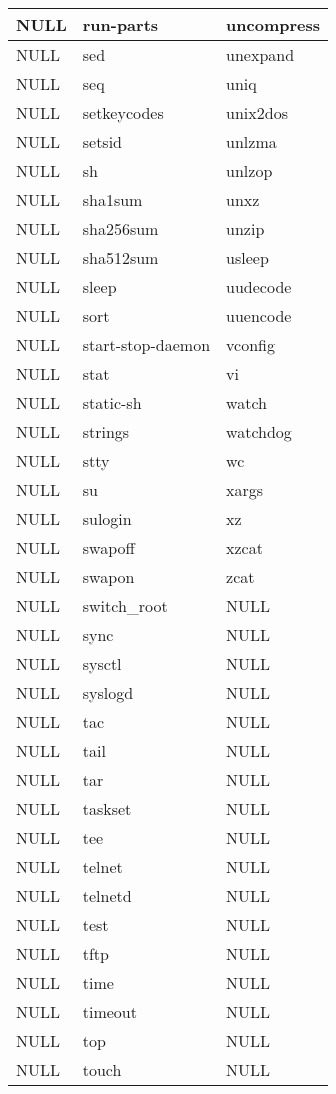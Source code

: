 \begin{longtable}{llp{64mm}}
NULL & run-parts & uncompress \\ \hline
NULL & sed & unexpand \\ \hline
NULL & seq & uniq \\ \hline
NULL & setkeycodes & unix2dos \\ \hline
NULL & setsid & unlzma \\ \hline
NULL & sh & unlzop \\ \hline
NULL & sha1sum & unxz \\ \hline
NULL & sha256sum & unzip \\ \hline
NULL & sha512sum & usleep \\ \hline
NULL & sleep & uudecode \\ \hline
NULL & sort & uuencode \\ \hline
NULL & start-stop-daemon & vconfig \\ \hline
NULL & stat & vi \\ \hline
NULL & static-sh & watch \\ \hline
NULL & strings & watchdog \\ \hline
NULL & stty & wc \\ \hline
NULL & su & xargs \\ \hline
NULL & sulogin & xz \\ \hline
NULL & swapoff & xzcat \\ \hline
NULL & swapon & zcat \\ \hline
NULL & switch\_root & NULL \\ \hline
NULL & sync & NULL \\ \hline
NULL & sysctl & NULL \\ \hline
NULL & syslogd & NULL \\ \hline
NULL & tac & NULL \\ \hline
NULL & tail & NULL \\ \hline
NULL & tar & NULL \\ \hline
NULL & taskset & NULL \\ \hline
NULL & tee & NULL \\ \hline
NULL & telnet & NULL \\ \hline
NULL & telnetd & NULL \\ \hline
NULL & test & NULL \\ \hline
NULL & tftp & NULL \\ \hline
NULL & time & NULL \\ \hline
NULL & timeout & NULL \\ \hline
NULL & top & NULL \\ \hline
NULL & touch & NULL \\ \hline

\end{longtable}
